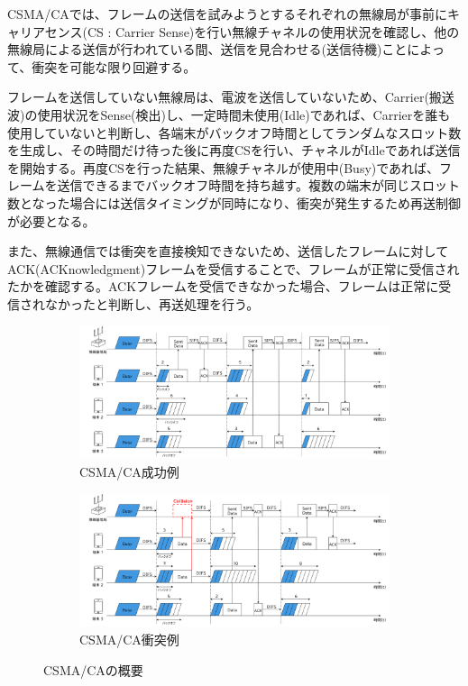 \documentclass[a4paper,10pt]{ltjsarticle}
\begin{document}
CSMA/CAでは、フレームの送信を試みようとするそれぞれの無線局が事前にキャリアセンス(CS : Carrier Sense)を行い無線チャネルの使用状況を確認し、他の無線局による送信が行われている間、送信を見合わせる(送信待機)ことによって、衝突を可能な限り回避する。

フレームを送信していない無線局は、電波を送信していないため、Carrier(搬送波)の使用状況をSense(検出)し、一定時間未使用(Idle)であれば、Carrierを誰も使用していないと判断し、各端末がバックオフ時間としてランダムなスロット数を生成し、その時間だけ待った後に再度CSを行い、チャネルがIdleであれば送信を開始する。再度CSを行った結果、無線チャネルが使用中(Busy)であれば、フレームを送信できるまでバックオフ時間を持ち越す。複数の端末が同じスロット数となった場合には送信タイミングが同時になり、衝突が発生するため再送制御が必要となる。

また、無線通信では衝突を直接検知できないため、送信したフレームに対してACK(ACKnowledgment)フレームを受信することで、フレームが正常に受信されたかを確認する。ACKフレームを受信できなかった場合、フレームは正常に受信されなかったと判断し、再送処理を行う。


\begin{figure}[H]
  \centering

  \begin{subfigure}{\textwidth}
    \centering
    \includegraphics[width=1\textwidth]{./assets/csma-ca-s.png}
    \caption{CSMA/CA成功例}
    \label{1a}
  \end{subfigure}


  \begin{subfigure}{\textwidth}
    \centering
    \includegraphics[width=1\textwidth]{./assets/csma-ca-f.png}
    \caption{CSMA/CA衝突例}
    \label{1b}
  \end{subfigure}


  \caption{CSMA/CAの概要}
  \label{CSMA/CA}
\end{figure}
\end{document}
